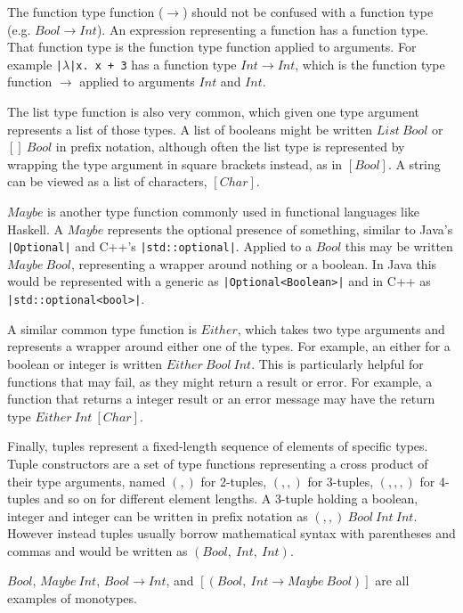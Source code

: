 \documentclass[a4paper,fleqn,oneside,12pt]{report}
\begin{document}
The function type function ($\rightarrow$) should not be confused with a function type (e.g. $Bool \rightarrow Int$). An expression representing a function has a function type. That function type is the function type function applied to arguments. For example \texttt{|$\lambda$|x. x + 3} has a function type $Int \rightarrow Int$, which is the function type function $\rightarrow$ applied to arguments $Int$ and $Int$.

The list type function is also very common, which given one type argument represents a list of those types. A list of booleans might be written $List\ Bool$ or $[]\ Bool$ in prefix notation, although often the list type is represented by wrapping the type argument in square brackets instead, as in $[Bool]$. A string can be viewed as a list of characters, $[Char]$.

$Maybe$ is another type function commonly used in functional languages like Haskell. A $Maybe$ represents the optional presence of something, similar to Java’s \texttt{|Optional|} and C++’s \texttt{|std::optional|}. Applied to a $Bool$ this may be written $Maybe\ Bool$, representing a wrapper around nothing or a boolean. In Java this would be represented with a generic as \texttt{|Optional<Boolean>|} and in C++ as \texttt{|std::optional<bool>|}.

A similar common type function is $Either$, which takes two type arguments and represents a wrapper around either one of the types. For example, an either for a boolean or integer is written $Either\ Bool\ Int$. This is particularly helpful for functions that may fail, as they might return a result or error. For example, a function that returns a integer result or an error message may have the return type $Either\ Int\ [Char]$.

Finally, tuples represent a fixed-length sequence of elements of specific types. Tuple constructors are a set of type functions representing a cross product of their type arguments, named $(,)$ for 2-tuples, $(,,)$ for 3-tuples, $(,,,)$ for 4-tuples and so on for different element lengths. A 3-tuple holding a boolean, integer and integer can be written in prefix notation as $(,,)\ Bool\ Int\ Int$. However instead tuples usually borrow mathematical syntax with parentheses and commas and would be written as $(Bool,\ Int,\ Int)$.

$Bool$, $Maybe\ Int$, $Bool \rightarrow Int$, and $[(Bool,\ Int \rightarrow Maybe\ Bool)]$ are all examples of monotypes.
\end{document}
